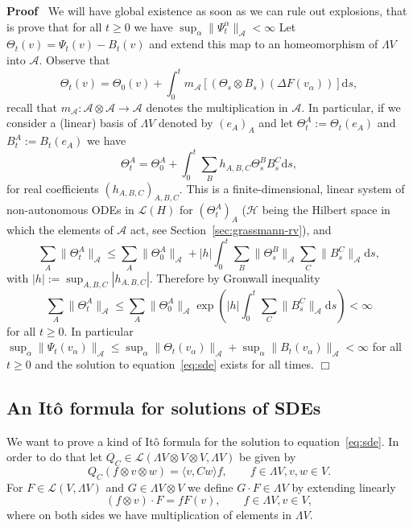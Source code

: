 \documentclass{article}
\newcommand{\assign}{:=}
\newcommand{\mathd}{\mathrm{d}}
\newenvironment{proof}{\noindent\textbf{Proof\ }}{\hspace*{\fill}$\Box$\medskip}
\begin{document}
\begin{proof}
  We will have global existence as soon as we can rule out explosions, that is
  prove that for all $t \geqslant 0$ we have $\sup_{\alpha} \| \Psi_t^{\alpha}
  \|_{\mathcal{A}} < \infty$ Let $\Theta_t (v) = \Psi_t (v) - B_t (v)$ and
  extend this map to an homeomorphism of $\Lambda V$ into $\mathcal{A}$.
  Observe that
  \[ \Theta_t (v) = \Theta_0 (v) + \int_0^t m_{\mathcal{A}} [(\Theta_s \otimes
     B_s) (\Delta F (v_{\alpha}))] \mathd s, \]
  recall that $m_{\mathcal{A}} : \mathcal{A} \otimes \mathcal{A} \rightarrow
  \mathcal{A}$ denotes the multiplication in $\mathcal{A}$. In particular, if
  we consider a (linear) basis of $\Lambda V$ denoted by $(e_A)_A$ and let
  $\Theta^A_t \assign \Theta_t (e_A)$ and $B^A_t \assign B_t (e_A)$ we have
  \[ \Theta_t^A = \Theta_0^A + \int_0^t \sum_B h_{A, B, C} \Theta_s^B B_s^C
     \mathd s, \]
  for real coefficients $(h_{A, B, C})_{A, B, C}$. This is a
  finite-dimensional, linear system of non-autonomous ODEs in $\mathcal{L}
  (H)$ for $(\Theta_t^A)_A$ ($\mathcal{H}$ being the Hilbert space in which
  the elements of $\mathcal{A}$ act, see Section~\ref{sec:grassmann-rv}), and
  \[ \sum_A \| \Theta_t^A \|_{\mathcal{A}} \leqslant \sum_A \| \Theta_0^A
     \|_{\mathcal{A}} + | h | \int_0^t \sum_B \| \Theta_s^B \|_{\mathcal{A}}
     \sum_C \| B_s^C \|_{\mathcal{A}} \mathd s, \]
  with $| h | \assign \sup_{A, B, C} | h_{A, B, C} |$. Therefore by Gronwall
  inequality
  \[ \sum_A \| \Theta_t^A \|_{\mathcal{A}} \leqslant \sum_A \| \Theta_0^A
     \|_{\mathcal{A}} \exp \left( | h | \int_0^t \sum_C \| B_s^C
     \|_{\mathcal{A}} \mathd s \right) < \infty \]
  for all $t \geqslant 0$. In particular $\sup_{\alpha} \| \Psi_t (v_{\alpha})
  \|_{\mathcal{A}} \leqslant \sup_{\alpha} \| \Theta_t (v_{\alpha})
  \|_{\mathcal{A}} + \sup_{\alpha} \| B_t (v_{\alpha}) \|_{\mathcal{A}} <
  \infty$ for all $t \geqslant 0$ and the solution to
  equation~{\eqref{eq:sde}} exists for all times.
\end{proof}

\subsection{An It{\^o} formula for solutions of SDEs}

We want to prove a kind of It{\^o} formula for the solution to
equation~{\eqref{eq:sde}}. In order to do that let $Q_C \in \mathcal{L}
(\Lambda V \otimes V \otimes V, \Lambda V)$ be given by
\begin{equation}
  Q_C (f \otimes v \otimes w) = \langle v, C w \rangle f, \qquad f \in \Lambda
  V, v, w \in V. \label{eq:QC}
\end{equation}
For $F \in \mathcal{L} (V, \Lambda V)$ and $G \in \Lambda V \otimes V$ we
define $G \cdot F \in \Lambda V$ by extending linearly
\[ (f \otimes v) \cdot F = f F (v), \qquad f \in \Lambda V, v \in V, \]
where on both sides we have multiplication of elements in $\Lambda V$.
\end{document}
